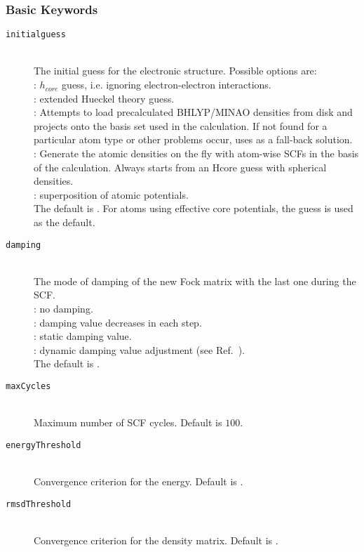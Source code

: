 \subsubsection{Basic Keywords}
\begin{description}
 \item [\texttt{initialguess}]\hfill \\
   The initial guess for the electronic structure. Possible options are:\\
   : $h_{core}$ guess, i.e. ignoring electron-electron interactions.\\
   : extended Hueckel theory guess.\\
   : Attempts to load precalculated BHLYP/MINAO densities from disk and projects onto the basis set used in the calculation. If not found for a particular atom type
   or other problems occur, uses  as a fall-back solution.\\
   : Generate the atomic densities on the fly with atom-wise SCFs in the basis of the calculation. Always starts from an Hcore guess with spherical densities.\\
   : superposition of atomic potentials.\\
   The default is . For atoms using effective core potentials, the 
   guess is used as the default.
 \item [\texttt{damping}]\hfill \\
   The mode of damping of the new Fock matrix with the last one during the SCF.\\
   : no damping.\\
   : damping value decreases in each step.\\
   : static damping value.\\
   : dynamic damping value adjustment (see Ref.~\cite{cances2000can}).\\
   The default is .
   \item [\texttt{maxCycles}]\hfill \\
   Maximum number of SCF cycles. Default is $100$.
   \item [\texttt{energyThreshold}]\hfill \\
   Convergence criterion for the energy. Default is .
   \item [\texttt{rmsdThreshold}]\hfill \\
   Convergence criterion for the density matrix. Default is .

\end{description}
